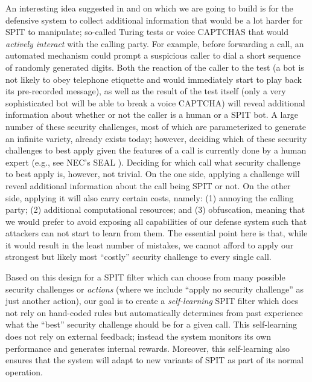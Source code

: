 \documentclass{llncs}
\begin{document}
An interesting idea suggested in \cite{schlegel06,gritzalis2008136} and on which we are going to build is for the defensive system to collect additional
information that would be a lot harder for SPIT to manipulate; so-called Turing tests or 
voice CAPTCHAS that would {\em actively interact} with the calling party. For example, before 
forwarding a call, an automated mechanism could prompt a suspicious caller to dial a short sequence of
randomly generated digits. Both the reaction of the caller to the test (a bot is not likely to obey
telephone etiquette and would immediately start to play back its pre-recorded message), as well
as the result of the test itself (only a very sophisticated bot will be able to break a voice CAPTCHA)
will reveal additional information about whether or not the caller is a human or a SPIT bot.
A large number of these security challenges, most of which
are parameterized to generate an infinite variety, already exists today; 
however, deciding which of these security challenges to best apply given 
the features of a call is currently done by a human expert (e.g., see NEC's SEAL \cite{schlegel06}).  
Deciding for which call what security challenge to best apply is, however, not trivial. On the one side, 
applying a challenge will reveal additional information about the call being SPIT or not. 
On the other side, applying it will also carry certain costs, namely: (1) annoying the calling party; (2)
additional computational resources; and (3) obfuscation, meaning that we would prefer to
avoid exposing all capabilities of our defense system such that attackers can not start to learn
from them. The essential point here is that, while it would result in the least number of mistakes, 
we cannot afford to apply our strongest but likely most ``costly'' security challenge to every single call. 

Based on this design for a SPIT filter which can choose from many possible security challenges or {\em actions} 
(where we include ``apply no security challenge'' as just another action), our goal is to create
a {\em self-learning} SPIT filter which does not rely on hand-coded rules but automatically determines from
past experience what the ``best'' security challenge should be for a given call.  This self-learning does 
not rely on external feedback; instead the system monitors its own performance and generates internal 
rewards. Moreover, this self-learning also ensures that the system will adapt to new variants of SPIT as part of its 
normal operation.
\end{document}
